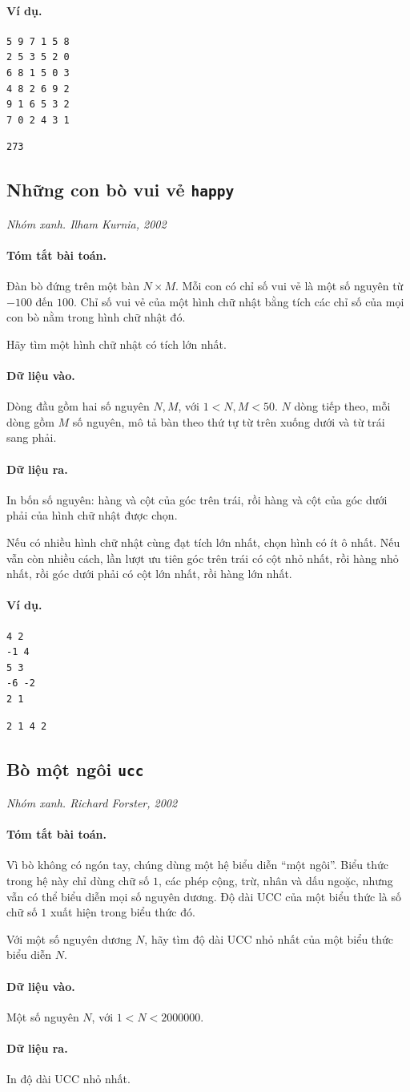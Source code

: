 \documentclass[11pt]{article}
\newcommand{\problem}[4]{%
  \subsection[#1 (#2)]{#1 \hfill {\normalsize\texttt{#2}}}%
  \noindent\textit{#3. #4}\par\smallskip
}
\newcommand{\iosec}[1]{\paragraph{#1}}
\begin{document}
\iosec{Ví dụ.}
\begin{verbatim}
5 9 7 1 5 8
2 5 3 5 2 0
6 8 1 5 0 3
4 8 2 6 9 2
9 1 6 5 3 2
7 0 2 4 3 1
\end{verbatim}

\begin{verbatim}
273
\end{verbatim}

\problem{Những con bò vui vẻ}{happy}{Nhóm xanh}{Ilham Kurnia, 2002}

\iosec{Tóm tắt bài toán.}
Đàn bò đứng trên một bàn \(N\times M\). Mỗi con có chỉ số vui vẻ là một số
nguyên từ \(-100\) đến \(100\). Chỉ số vui vẻ của một hình chữ nhật bằng tích
các chỉ số của mọi con bò nằm trong hình chữ nhật đó.

Hãy tìm một hình chữ nhật có tích lớn nhất.

\iosec{Dữ liệu vào.}
Dòng đầu gồm hai số nguyên \(N,M\), với \(1<N,M<50\). \(N\) dòng tiếp theo,
mỗi dòng gồm \(M\) số nguyên, mô tả bàn theo thứ tự từ trên xuống dưới và từ
trái sang phải.

\iosec{Dữ liệu ra.}
In bốn số nguyên: hàng và cột của góc trên trái, rồi hàng và cột của góc dưới
phải của hình chữ nhật được chọn.

Nếu có nhiều hình chữ nhật cùng đạt tích lớn nhất, chọn hình có ít ô nhất. Nếu
vẫn còn nhiều cách, lần lượt ưu tiên góc trên trái có cột nhỏ nhất, rồi hàng
nhỏ nhất, rồi góc dưới phải có cột lớn nhất, rồi hàng lớn nhất.

\iosec{Ví dụ.}
\begin{verbatim}
4 2
-1 4
5 3
-6 -2
2 1
\end{verbatim}

\begin{verbatim}
2 1 4 2
\end{verbatim}

\problem{Bò một ngôi}{ucc}{Nhóm xanh}{Richard Forster, 2002}

\iosec{Tóm tắt bài toán.}
Vì bò không có ngón tay, chúng dùng một hệ biểu diễn ``một ngôi''. Biểu thức
trong hệ này chỉ dùng chữ số \(1\), các phép cộng, trừ, nhân và dấu ngoặc,
nhưng vẫn có thể biểu diễn mọi số nguyên dương. Độ dài UCC của một biểu thức
là số chữ số \(1\) xuất hiện trong biểu thức đó.

Với một số nguyên dương \(N\), hãy tìm độ dài UCC nhỏ nhất của một biểu thức
biểu diễn \(N\).

\iosec{Dữ liệu vào.}
Một số nguyên \(N\), với \(1<N<2000000\).

\iosec{Dữ liệu ra.}
In độ dài UCC nhỏ nhất.
\end{document}
